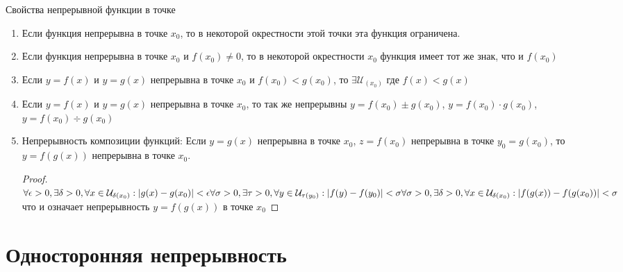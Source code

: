 \documentclass[oneside]{book}
\begin{document}
\begin{enumerate}
Свойства непрерывной функции в точке
\begin{enumerate}
    \item Если функция непрерывна в точке $x_0$, то в некоторой окрестности этой точки эта функция ограничена.
    \item Если функция непрерывна в точке $x_0$ и $f(x_0) \neq 0$, то в некоторой окрестности $x_0$ функция имеет тот же знак, что и $f(x_0)$
    \item Если $y = f(x)$ и $y = g(x)$ непрерывна в точке $x_0$ и $f(x_0) < g(x_0)$, то $\exists \mathcal{U}_{(x_0)}$ где $f(x) < g(x)$
    \item Если $y = f(x)$ и $y = g(x)$ непрерывна в точке $x_0$, то так же непрерывны $y = f(x_0) \pm g(x_0)$, $y = f(x_0) \cdot g(x_0)$, $y = f(x_0) \div g(x_0)$
    \item Непрерывность композиции функций: Если $y = g(x)$ непрерывна в точке $x_0$, $z = f(x_0)$ непрерывна в точке $y_0 = g(x_0)$, то
          $y = f(g(x))$ непрерывна в точке $x_0$.
          \begin{proof}
            $ \\
            \forall \epsilon > 0, \exists \delta > 0, \forall x \in \mathcal{U}_{\delta(x_0)}: |g(x) - g(x_0)|<\epsilon \\
            \forall \sigma > 0, \exists \tau > 0, \forall y \in \mathcal{U}_{\tau(y_0)}: |f(y) - f(y_0)|<\sigma \\
            \forall \sigma > 0, \exists \delta > 0, \forall x \in \mathcal{U}_{\delta(x_0)}: |f(g(x)) - f(g(x_0))|<\sigma \\
            $
            что и означает непрерывность $y = f(g(x))$ в точке $x_0$
        \end{proof}
\end{enumerate}

\section[Односторонняя]{Односторонняя непрерывность}


\end{enumerate}
\end{document}
